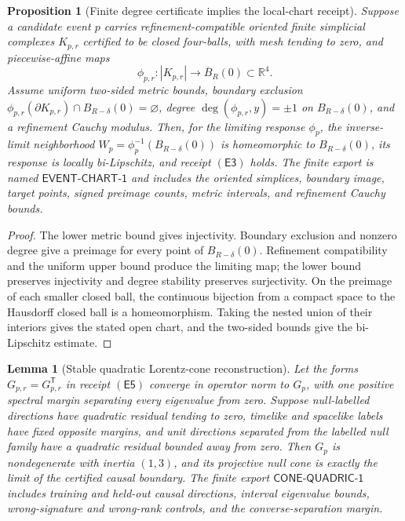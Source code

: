 \documentclass[11pt]{article}
\newtheorem{proposition}[theorem]{Proposition}
\newtheorem{lemma}[theorem]{Lemma}
\begin{document}
\begin{proposition}[Finite degree certificate implies the local-chart receipt]
\label{prop:event-chart-degree}
Suppose a candidate event \(p\) carries refinement-compatible oriented finite simplicial
complexes \(K_{p,r}\) certified to be closed four-balls, with mesh tending to zero, and
piecewise-affine maps
\[
\phi_{p,r}:|K_{p,r}|\longrightarrow\overline B_R(0)\subset\mathbb R^4.
\]
Assume uniform two-sided metric bounds, boundary exclusion
\(\phi_{p,r}(\partial K_{p,r})\cap B_{R-\delta}(0)=\varnothing\), degree
\(\deg(\phi_{p,r},y)=\pm1\) on \(B_{R-\delta}(0)\), and a refinement Cauchy modulus.  Then,
for the limiting response \(\phi_p\), the inverse-limit neighborhood
\(W_p=\phi_p^{-1}(B_{R-\delta}(0))\) is homeomorphic to
\(B_{R-\delta}(0)\), its response is locally bi-Lipschitz, and receipt
\(\mathsf{(E3)}\) holds.
The finite export is named \(\mathsf{EVENT\text{-}CHART\text{-}1}\) and includes the oriented
simplices, boundary image, target points, signed preimage counts, metric intervals, and refinement
Cauchy bounds.
\end{proposition}

\begin{proof}
The lower metric bound gives injectivity.  Boundary exclusion and nonzero degree give a preimage
for every point of \(B_{R-\delta}(0)\).  Refinement compatibility and the uniform upper bound
produce the limiting map; the lower bound preserves injectivity and degree stability preserves
surjectivity.  On the preimage of each smaller closed ball, the continuous bijection from a
compact space to the Hausdorff closed ball is a homeomorphism.  Taking the nested union of their
interiors gives the stated open chart, and the
two-sided bounds give the bi-Lipschitz estimate.
\end{proof}

\begin{lemma}[Stable quadratic Lorentz-cone reconstruction]
\label{lem:stable-lorentz-cone}
Let the forms \(G_{p,r}=G_{p,r}^{\mathsf T}\) in receipt \(\mathsf{(E5)}\) converge in operator
norm to \(G_p\), with one positive spectral margin separating every eigenvalue from zero.  Suppose
null-labelled directions have quadratic residual tending to zero, timelike and spacelike labels
have fixed opposite margins, and unit directions separated from the labelled null family have a
quadratic residual bounded away from zero.  Then \(G_p\) is nondegenerate with inertia \((1,3)\),
and its projective null cone is exactly the limit of the certified causal boundary.
The finite export \(\mathsf{CONE\text{-}QUADRIC\text{-}1}\) includes training and held-out causal
directions, interval eigenvalue bounds, wrong-signature and wrong-rank controls, and the
converse-separation margin.
\end{lemma}
\end{document}
